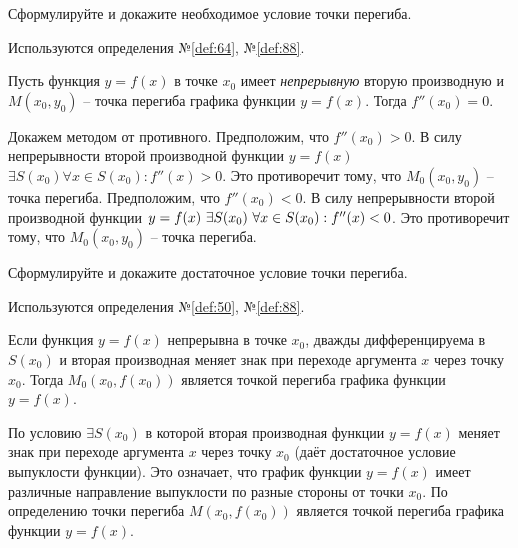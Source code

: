 \begin{question}
    Сформулируйте и докажите необходимое условие точки перегиба.
\end{question}
\begin{used}
    Используются определения №\ref{def:64}, №\ref{def:88}.
\end{used}
\begin{theorem}
    Пусть функция $y = f(x)$ в точке $x_0$ имеет \textit{непрерывную} вторую производную и $M(x_0, y_0)$ -- точка перегиба графика функции $y = f(x)$. Тогда $f''(x_0) = 0$.
\end{theorem}
\begin{necessity}
    Докажем методом от противного. 
    Предположим, что $f''(x_0) > 0$. В силу непрерывности второй производной функции  $y = f(x)$ $\exists  S(x_0) \forall  x \in S(x_0) : f''(x) > 0$. Это противоречит тому, что $M_0(x_0, y_0)$ -- точка перегиба.
    Предположим, что $f''(x_0) < 0$. В силу непрерывности второй производной функции  $y = f(x) \nobreakspace \exists S(x_0) \nobreakspace \forall  x \in S(x_0) : f''(x) < 0$. Это противоречит тому, что $M_0(x_0, y_0)$ -- точка перегиба.
\end{necessity}
\pagebreak



\begin{question}
    Сформулируйте и докажите достаточное условие точки перегиба.
\end{question}
\begin{used}
    Используются определения №\ref{def:50}, №\ref{def:88}.
\end{used}
\begin{theorem}
    Если функция $y = f(x)$ непрерывна в точке $x_0$, дважды дифференцируема в $S(x_0)$ и вторая производная меняет знак при переходе аргумента $x$ через точку $x_0$. Тогда $M_0(x_0, f(x_0))$ является точкой перегиба графика функции $y = f(x)$.
\end{theorem}
\begin{sufficiency}
    По условию $\exists S(x_0)$ в которой вторая производная функции $y = f(x)$ меняет знак при переходе аргумента $x$ через точку $x_0$ (даёт достаточное условие выпуклости функции).
    Это означает, что график функции $y = f(x)$ имеет различные направление выпуклости по разные стороны от точки $x_0$.
    По определению точки перегиба $M(x_0, f(x_0))$ является точкой перегиба графика функции $y = f(x)$.
\end{sufficiency}
\pagebreak
